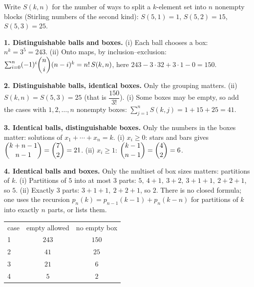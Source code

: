 Write $S(k,n)$ for the number of ways to split a $k$-element set into $n$ nonempty blocks (Stirling numbers of the second kind): $S(5,1)=1$, $S(5,2)=15$, $S(5,3)=25$.

\textbf{1. Distinguishable balls and boxes.} (i) Each ball chooses a box: $n^k=3^5=243$. (ii) Onto maps, by inclusion--exclusion: $\sum_{i=0}^{n}(-1)^i\dbinom ni(n-i)^k=n!\,S(k,n)$, here $243-3\cdot32+3\cdot1-0=150$.

\textbf{2. Distinguishable balls, identical boxes.} Only the grouping matters. (ii) $S(k,n)=S(5,3)=25$ (that is $\dfrac{150}{3!}$). (i) Some boxes may be empty, so add the cases with $1,2,\ldots,n$ nonempty boxes: $\sum_{j=1}^{n}S(k,j)=1+15+25=41$.

\textbf{3. Identical balls, distinguishable boxes.} Only the numbers in the boxes matter: solutions of $x_1+\cdots+x_n=k$. (i) $x_i\ge0$: stars and bars gives $\dbinom{k+n-1}{n-1}=\dbinom72=21$. (ii) $x_i\ge1$: $\dbinom{k-1}{n-1}=\dbinom42=6$.

\textbf{4. Identical balls and boxes.} Only the multiset of box sizes matters: partitions of $k$. (i) Partitions of $5$ into at most $3$ parts: $5,\ 4+1,\ 3+2,\ 3+1+1,\ 2+2+1$, so $5$. (ii) Exactly $3$ parts: $3+1+1,\ 2+2+1$, so $2$. There is no closed formula; one uses the recursion $p_n(k)=p_{n-1}(k-1)+p_n(k-n)$ for partitions of $k$ into exactly $n$ parts, or lists them.

\begin{center}
\begin{tabular}{lcc}
case & empty allowed & no empty box\\
1 & $243$ & $150$\\
2 & $41$ & $25$\\
3 & $21$ & $6$\\
4 & $5$ & $2$
\end{tabular}
\end{center}
